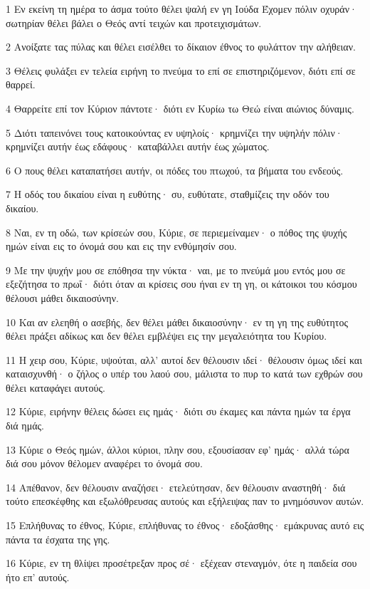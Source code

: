 \par 1 Εν εκείνη τη ημέρα το άσμα τούτο θέλει ψαλή εν γη Ιούδα Έχομεν πόλιν οχυράν· σωτηρίαν θέλει βάλει ο Θεός αντί τειχών και προτειχισμάτων.
\par 2 Ανοίξατε τας πύλας και θέλει εισέλθει το δίκαιον έθνος το φυλάττον την αλήθειαν.
\par 3 Θέλεις φυλάξει εν τελεία ειρήνη το πνεύμα το επί σε επιστηριζόμενον, διότι επί σε θαρρεί.
\par 4 Θαρρείτε επί τον Κύριον πάντοτε· διότι εν Κυρίω τω Θεώ είναι αιώνιος δύναμις.
\par 5 Διότι ταπεινόνει τους κατοικούντας εν υψηλοίς· κρημνίζει την υψηλήν πόλιν· κρημνίζει αυτήν έως εδάφους· καταβάλλει αυτήν έως χώματος.
\par 6 Ο πους θέλει καταπατήσει αυτήν, οι πόδες του πτωχού, τα βήματα του ενδεούς.
\par 7 Η οδός του δικαίου είναι η ευθύτης· συ, ευθύτατε, σταθμίζεις την οδόν του δικαίου.
\par 8 Ναι, εν τη οδώ, των κρίσεών σου, Κύριε, σε περιεμείναμεν· ο πόθος της ψυχής ημών είναι εις το όνομά σου και εις την ενθύμησίν σου.
\par 9 Με την ψυχήν μου σε επόθησα την νύκτα· ναι, με το πνεύμά μου εντός μου σε εξεζήτησα το πρωΐ· διότι όταν αι κρίσεις σου ήναι εν τη γη, οι κάτοικοι του κόσμου θέλουσι μάθει δικαιοσύνην.
\par 10 Και αν ελεηθή ο ασεβής, δεν θέλει μάθει δικαιοσύνην· εν τη γη της ευθύτητος θέλει πράξει αδίκως και δεν θέλει εμβλέψει εις την μεγαλειότητα του Κυρίου.
\par 11 Η χειρ σου, Κύριε, υψούται, αλλ' αυτοί δεν θέλουσιν ιδεί· θέλουσιν όμως ιδεί και καταισχυνθή· ο ζήλος ο υπέρ του λαού σου, μάλιστα το πυρ το κατά των εχθρών σου θέλει καταφάγει αυτούς.
\par 12 Κύριε, ειρήνην θέλεις δώσει εις ημάς· διότι συ έκαμες και πάντα ημών τα έργα διά ημάς.
\par 13 Κύριε ο Θεός ημών, άλλοι κύριοι, πλην σου, εξουσίασαν εφ' ημάς· αλλά τώρα διά σου μόνον θέλομεν αναφέρει το όνομά σου.
\par 14 Απέθανον, δεν θέλουσιν αναζήσει· ετελεύτησαν, δεν θέλουσιν αναστηθή· διά τούτο επεσκέφθης και εξωλόθρευσας αυτούς και εξήλειψας παν το μνημόσυνον αυτών.
\par 15 Επλήθυνας το έθνος, Κύριε, επλήθυνας το έθνος· εδοξάσθης· εμάκρυνας αυτό εις πάντα τα έσχατα της γης.
\par 16 Κύριε, εν τη θλίψει προσέτρεξαν προς σέ· εξέχεαν στεναγμόν, ότε η παιδεία σου ήτο επ' αυτούς.

